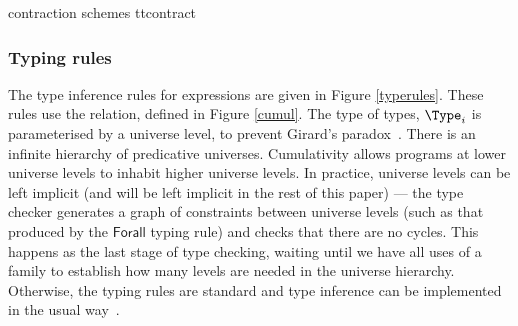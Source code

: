 {\TT{} contraction schemes}
{ttcontract}



\subsubsection{Typing rules}

\label{sect:typerules}

The type inference rules for \TT{} expressions are given in Figure
\ref{typerules}.  These rules use the  relation, defined in
Figure \ref{cumul}. The type of types, $\Type_i$ is parameterised by a universe
level, to prevent Girard's paradox~\cite{coquand1986analysis}.  There is an
infinite hierarchy of predicative universes.  Cumulativity allows programs at
lower universe levels to inhabit higher universe levels. In practice, universe levels
can be left implicit (and will be left implicit in the rest of this paper) ---
the type checker generates a graph of constraints between universe levels (such
as that produced by the $\mathsf{Forall}$ typing rule) and checks that there
are no cycles. This happens as the last stage of type checking, waiting until
we have all uses of a family to establish how many levels are needed in the
universe hierarchy.
Otherwise, the typing rules are standard and type inference can
be implemented in the usual way~\cite{loh2010tutorial}.


